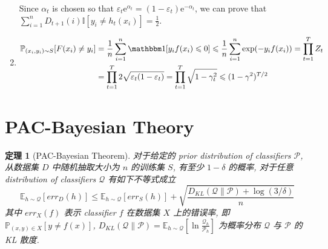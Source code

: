 \documentclass[8pt]{article}
\theoremstyle{compact}
\newtheorem{theorem}{定理}[section]
\def\le{\leqslant}
\def\e{\mathrm{e}}
\begin{document}
\begin{enumerate}
	Since $\alpha_t$ is chosen so that $\varepsilon_t \e^{\alpha_t} = (1 - \varepsilon_t)\e^{-\alpha_t}$, we can prove that $\sum\limits_{i=1}^{n}D_{t+1}(i)\mathbb I[y_i \neq h_t(x_i)] = \frac12$.

	\item \begin{align*}
		\begin{split}
			\mathbb P_{(x_i, y_i)\sim S}[F(x_i) \neq y_i] &= \frac1n \sum_{i=1}^n \mathbbm 1[y_if(x_i) \le 0] \le \frac1n \sum_{i=1}^{n} \exp(-y_if(x_i)) = \prod_{t=1}^T Z_t \\
			&= \prod_{t=1}^T 2\sqrt{\varepsilon_t(1 - \varepsilon_t)} 
			= \prod_{t=1}^T \sqrt{1 - \gamma_t^2} 
			\le (1 - \gamma^2)^{T/2}
		\end{split}
	\end{align*}
\end{enumerate}



\newpage
\section{PAC-Bayesian Theory}
\begin{theorem}[PAC-Bayesian Theorem]
	对于给定的 prior distribution of classifiers $\mathcal P$, 从数据集 $D$ 中随机抽取大小为 $n$ 的训练集 $S$, 有至少 $1 - \delta$ 的概率, 对于任意 distribution of classifiers $\mathcal Q$ 有如下不等式成立
	$$\mathbb E_{h \sim \mathcal Q}[err_D(h)] \le \mathbb E_{h \sim \mathcal Q}[err_S(h)] + \sqrt{\frac{D_{KL}(\mathcal Q \| \mathcal P) + \log(3 / \delta)}{n}}$$
	其中 $err_{X}(f)$ 表示 classifier $f$ 在数据集 $X$ 上的错误率, 即 $\mathbb P_{(x, y) \in X}[y \neq f(x)]$, $D_{KL}(\mathcal Q \| \mathcal P) = \mathbb E_{h \sim \mathcal Q}\left[\ln \frac{\mathcal Q_h}{\mathcal P_h}\right]$ 为概率分布 $\mathcal Q$ 与 $\mathcal P$ 的 KL 散度.
	\label{PAC-Bayesian}
\end{theorem}
\end{document}
